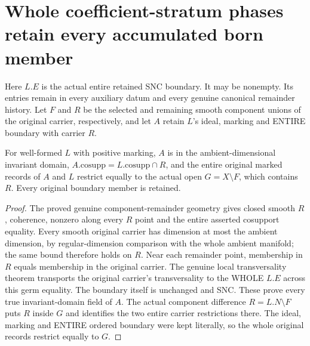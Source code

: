 \section{Whole coefficient-stratum phases retain every accumulated born member}
\label{sec:boundary-coefficient-stratum-resolution}

Here $L.E$ is the actual entire retained SNC boundary. It may be nonempty.
Its entries remain in every auxiliary datum and every genuine canonical
remainder history. Let $F$ and $R$ be the selected and remaining smooth
component unions of the original carrier, respectively, and let $A$ retain
$L$'s ideal, marking and ENTIRE boundary with carrier $R$.

\begin{theorem}
\label{hir:boundary-coefficient-remainder-original-domain}
\leanok
For well-formed $L$ with positive marking, $A$ is in the ambient-dimensional
invariant domain, $A.\mathrm{cosupp}=L.\mathrm{cosupp}\cap R$, and the entire
original marked records of $A$ and $L$ restrict equally to the actual open
$G=X\setminus F$, which contains $R$. Every original boundary member is retained.
\end{theorem}
\begin{proof}
The proved genuine component-remainder geometry gives closed smooth $R$,
coherence, nonzero along every $R$ point and the entire asserted cosupport
equality. Every smooth original carrier has dimension at most the ambient
dimension, by regular-dimension comparison with the whole ambient manifold;
the same bound therefore holds on $R$. Near each remainder point, membership
in $R$ equals membership in the original carrier. The genuine local
transversality theorem transports the original carrier's transversality to
the WHOLE $L.E$ across this germ equality. The boundary itself is unchanged
and SNC. These prove every true invariant-domain field of $A$.
The actual component difference $R=L.N\setminus F$ puts $R$ inside $G$ and
identifies the two entire carrier restrictions there. The ideal, marking and
ENTIRE ordered boundary were kept literally, so the whole original records
restrict equally to $G$.
\end{proof}

